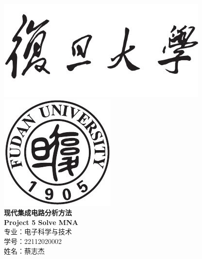 \documentclass[12pt]{article}
\newcommand{\hmwkTitle}{Project 5 Solve MNA}
\newcommand{\hmwkAuthorName}{姓名：蔡志杰 }
\newcommand{\hmwMajor}{专业：电子科学与技术}
\newcommand{\hmwNumber}{学号：22112020002}
\begin{document}
\begin{titlepage}
\begin{center}



\includegraphics[scale = 0.9]{fudan.jpg}\\
\includegraphics[scale = 0.6]{fudan_logo.jpg}\\
\vspace{0.5in}
\linespread{1.9}\huge {\bfseries 现代集成电路分析方法}\\
\linespread{1.9}\LARGE {\bfseries \textbf{\hmwkTitle}}\\
\vspace{1.0in}
\large \hmwMajor{}\\
\large \hmwNumber{}\\
\large \hmwkAuthorName{}\\

\end{center}
\end{titlepage}
\end{document}
